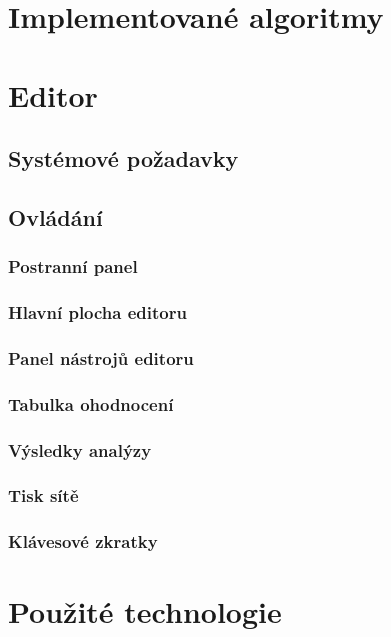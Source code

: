 \documentclass[
  biblatex,
  glossaries,
  index
]{kidiplom}
\begin{document}
  
\section{Implementované algoritmy}


  




\section{Editor}
\subsection{Systémové požadavky}
\subsection{Ovládání}
\subsubsection{Postranní panel}
\subsubsection{Hlavní plocha editoru}
\subsubsection{Panel nástrojů editoru}
\subsubsection{Tabulka ohodnocení}
\subsubsection{Výsledky analýzy}
\subsubsection{Tisk sítě}

\subsubsection{Klávesové zkratky}





\section{Použité technologie}
\end{document}
